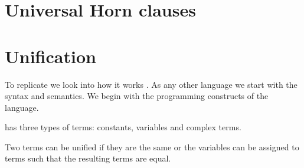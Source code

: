 \documentclass[thesis-solanki.tex]{subfiles}
\begin{document}
\section{Universal Horn clauses}


\section{Unification}

To replicate  we look into how it works .
%
As any other language we start with the syntax and semantics.
We begin with the programming constructs of the language.

 has three types of terms: constants, variables and complex terms.

Two terms can be unified if they are the same or the variables can be assigned to terms such that the resulting
terms are equal.
\end{document}

